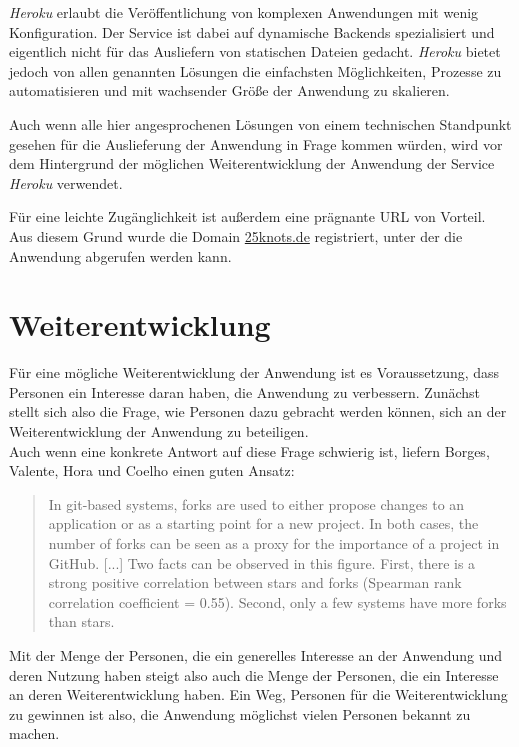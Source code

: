 \textit{Heroku} erlaubt die Veröffentlichung von komplexen Anwendungen mit wenig Konfiguration. Der Service ist dabei auf dynamische Backends spezialisiert und eigentlich nicht für das Ausliefern von statischen Dateien gedacht. \textit{Heroku} bietet jedoch von allen genannten Lösungen die einfachsten Möglichkeiten, Prozesse zu automatisieren und mit wachsender Größe der Anwendung zu skalieren.

Auch wenn alle hier angesprochenen Lösungen von einem technischen Standpunkt gesehen für die Auslieferung der Anwendung in Frage kommen würden, wird vor dem Hintergrund der möglichen Weiterentwicklung der Anwendung der Service \textit{Heroku} verwendet.

Für eine leichte Zugänglichkeit ist außerdem eine prägnante URL von Vorteil. Aus diesem Grund wurde die Domain \url{25knots.de} registriert, unter der die Anwendung abgerufen werden kann.

\section{Weiterentwicklung}
Für eine mögliche Weiterentwicklung der Anwendung ist es Voraussetzung, dass Personen ein Interesse daran haben, die Anwendung zu verbessern. Zunächst stellt sich also die Frage, wie Personen dazu gebracht werden können, sich an der Weiterentwicklung der Anwendung zu beteiligen.\\
Auch wenn eine konkrete Antwort auf diese Frage schwierig ist, liefern Borges, Valente, Hora und Coelho einen guten Ansatz:

\begin{quote}
  In git-based systems, forks are used to either propose changes to an application or as
a starting point for a new project. In both cases, the number of forks can be seen as a proxy
for the importance of a project in GitHub. [...] Two facts can be observed in this figure. First, there is a strong positive
correlation between stars and forks (Spearman rank correlation coefficient = 0.55). Second,
only a few systems have more forks than stars. \cite{borges2015popularity}
\end{quote}

Mit der Menge der Personen, die ein generelles Interesse an der Anwendung und deren Nutzung haben steigt also auch die Menge der Personen, die ein Interesse an deren Weiterentwicklung haben. Ein Weg, Personen für die Weiterentwicklung zu gewinnen ist also, die Anwendung möglichst vielen Personen bekannt zu machen.

